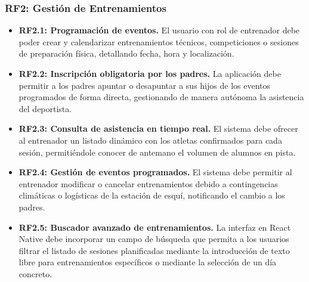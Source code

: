         \subsubsection*{RF2: Gestión de Entrenamientos}
        \begin{itemize}
            \item \textbf{RF2.1: Programación de eventos.} El usuario con rol de entrenador debe poder crear y calendarizar entrenamientos técnicos, competiciones o sesiones de preparación física, detallando fecha, hora y localización.
            \item \textbf{RF2.2: Inscripción obligatoria por los padres.} La aplicación debe permitir a los padres apuntar o desapuntar a sus hijos de los eventos programados de forma directa, gestionando de manera autónoma la asistencia del deportista.
            \item \textbf{RF2.3: Consulta de asistencia en tiempo real.} El sistema debe ofrecer al entrenador un listado dinámico con los atletas confirmados para cada sesión, permitiéndole conocer de antemano el volumen de alumnos en pista.
            \item \textbf{RF2.4: Gestión de eventos programados.} El sistema debe permitir al entrenador modificar o cancelar entrenamientos debido a contingencias climáticas o logísticas de la estación de esquí, notificando el cambio a los padres.
            \item \textbf{RF2.5: Buscador avanzado de entrenamientos.} La interfaz en React Native debe incorporar un campo de búsqueda que permita a los usuarios filtrar el listado de sesiones planificadas mediante la introducción de texto libre para entrenamientos específicos o mediante la selección de un día concreto.                
        \end{itemize}


